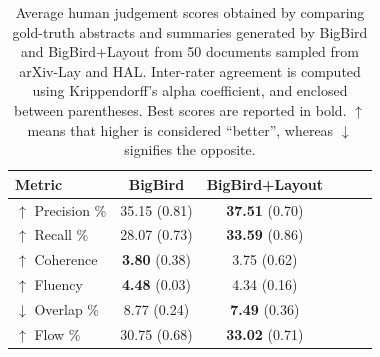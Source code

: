 \begin{table}
\centering
\small
\begin{tabular}{lccccc}
\toprule
\textbf{Metric}        & \textbf{BigBird} & \textbf{BigBird+Layout} \\ 
\midrule
$\uparrow$ Precision \%    &    35.15 \scriptsize{(0.81)}            &      \textbf{37.51} \scriptsize{(0.70)}                   \\
$\uparrow$ Recall \%       &    28.07 \scriptsize{(0.73)}             &     \textbf{33.59} \scriptsize{(0.86)}                   \\
$\uparrow$ Coherence     &     \textbf{3.80} \scriptsize{(0.38)}             &      3.75 \scriptsize{(0.62)}                   \\ 
$\uparrow$ Fluency       &     \textbf{4.48} \scriptsize{(0.03)}             &      4.34 \scriptsize{(0.16)}                   \\
$\downarrow$ Overlap \%     &    8.77 \scriptsize{(0.24)}             &     \textbf{7.49} \scriptsize{(0.36)}                    \\ 
$\uparrow$ Flow \%             &   30.75 \scriptsize{(0.68)}          &    \textbf{33.02} \scriptsize{(0.71)}                     \\
\bottomrule
\end{tabular}
\caption{Average human judgement scores obtained by comparing gold-truth abstracts and summaries generated by BigBird and BigBird+Layout from 50 documents sampled from arXiv-Lay and HAL. Inter-rater agreement	is computed using Krippendorff's alpha coefficient, and enclosed between parentheses. Best scores are reported in bold. $\uparrow$ means that higher is considered “better”, whereas $\downarrow$ signifies the opposite.}
\label{table:human-eval-scores}
\end{table}

